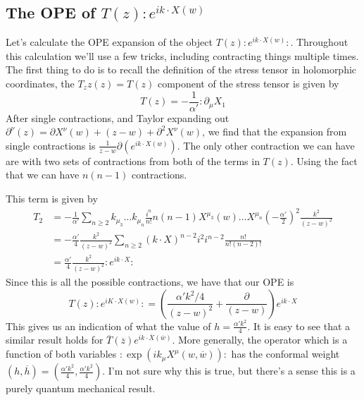 \documentclass[11pt, oneside]{article}   	%
\theoremstyle{slanted}
\begin{document}
\subsection{The OPE of $ T \left(  z  \right)  : e ^{ i k \cdot  X \left(  w  \right)  } $}
Let's calculate the OPE 
expansion of the object $ T \left(  z  \right)  : e ^{ i k \cdot  X \left(  w  \right)  } : $. 
Throughout this calculation we'll use a 
few tricks, including contracting 
things multiple times. 
The first thing to do is to 
recall the definition of the stress tensor 
in holomorphic coordinates, the $ T _zz \left(  z  \right)  = T \left(  z  \right)  $ 
component of the stress tensor is given by 
\[
 T \left(  z  \right)   = - \frac{1}{\alpha ' } : \partial  _ \mu X_1
\] After single 
contractions, and Taylor expanding out 
$ \partial  ^ \nu \left( z \right) = \partial X ^ \nu \left( w   \right) 
+ \left( z - w  \right)  + \partial  ^  2 X ^ \nu \left(   w  \right)  $, 
we find that the expansion from 
single contractions is $ \frac{1}{z - w } \partial  \left(  e 
^{ i k \cdot  X\left(  w  \right)  }\right) $. 
The only other contraction we can 
have are with two sets of contractions 
from both of the terms in $ T \left( z   \right)  $. 
Using the fact that we can have $ n \left( n - 1  \right)  $ contractions. 

This term is 
given by 
\begin{align*}
	T _ 2 &= - \frac{1}{\alpha '  } \sum _{ n \geq  2 } k _{ \mu _ 3 } \dots k _{ \mu _ n } 
	\frac{i^ n  }{ n ! } n \left( n - 1  \right)  X^{ \mu _ 3 } \left(  w  \right)  
	\dots X ^{ \mu _ n } \left( - \frac{\alpha '  }{ 2  } \right)  ^2 \frac{k ^  2 }{ \left( z - w  \right)  ^ 2 } \\
	      &=  -\frac{\alpha'  }{4 } \frac{k ^ 2  }{ \left( z - w  \right)  ^ 2 } 
	      \sum_{ n \geq 2 } \left( k \cdot  X  \right) ^{n - 2 } i ^ 2 i ^{ n - 2  }
	      \frac{n  ! }{n ! \left( n - 2  \right)! }\\
	      &=  \frac{\alpha ' }{ 4 } \frac{k ^ 2  }{ \left( z - w  \right)  ^ 2 } : e ^{ i k \cdot  X } : 
\end{align*}
Since this is all the possible 
contractions, we 
have that our OPE is 
\[
	T \left( z  \right)  : e ^{ i K \cdot  X \left(  w  \right)  } : = 
	\left( \frac{\alpha ' k ^ 2 /  4 }{ \left(  z - w  \right)  ^ 2 } + \frac{\partial   }{ 
	\left( z - w  \right)   }  \right)  e ^{ i k \cdot  X }
\] This gives us an 
indication of what the value of $ h = \frac{\alpha ' k ^  2 }{ 4} $. 
It is easy to see that a similar 
result holds for $ \overline{ T } \left( \overline{ z }  \right)  e ^{ i k \cdot  \overline{ X  } \left( 
\overline{ w } \right)  } $. 
More generally, 
the operator which is a function of 
both variables $: \exp \left( i k  _\mu X ^ \mu \left( w , \overline{ w }  \right)   \right)  :$
has the conformal weight $ \left( h , \overline{ h }  \right)   = \left( 
\frac{\alpha  'k ^ 2 }{ 4} , \frac{\alpha ' k ^ 2 }{ 4 } \right) $. 
I'm not sure why this is true, but there's 
a sense this is a purely quantum mechanical result. 
\end{document}
